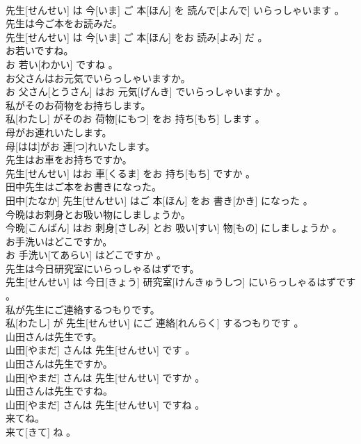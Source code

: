 \documentclass[8pt]{extreport}
\begin{document}
\begin{CJK}{UTF8}{min}
\\	先生[せんせい] は 今[いま] ご 本[ほん] を 読んで[よんで] いらっしゃいます 。
\\	先生は今ご本をお読みだ。	
\\	先生[せんせい] は 今[いま] ご 本[ほん] をお 読み[よみ] だ 。
\\	お若いですね。	
\\	お 若い[わかい] ですね 。
\\	お父さんはお元気でいらっしゃいますか。	
\\	お 父さん[とうさん] はお 元気[げんき] でいらっしゃいますか 。
\\	私がそのお荷物をお持ちします。	
\\	私[わたし] がそのお 荷物[にもつ] をお 持ち[もち] します 。
\\	母がお連れいたします。	
\\	母[はは]がお 連[つ]れいたします。
\\	先生はお車をお持ちですか。	
\\	先生[せんせい] はお 車[くるま] をお 持ち[もち] ですか 。
\\	田中先生はご本をお書きになった。	
\\	田中[たなか] 先生[せんせい] はご 本[ほん] をお 書き[かき] になった 。
\\	今晩はお刺身とお吸い物にしましょうか。	
\\	今晩[こんばん] はお 刺身[さしみ] とお 吸い[すい] 物[もの] にしましょうか 。
\\	お手洗いはどこですか。	
\\	お 手洗い[てあらい] はどこですか 。
\\	先生は今日研究室にいらっしゃるはずです。	
\\	先生[せんせい] は 今日[きょう] 研究室[けんきゅうしつ] にいらっしゃるはずです 。
\\	私が先生にご連絡するつもりです。	
\\	私[わたし] が 先生[せんせい] にご 連絡[れんらく] するつもりです 。
\\	山田さんは先生です。	
\\	山田[やまだ] さんは 先生[せんせい] です 。
\\	山田さんは先生ですか。	
\\	山田[やまだ] さんは 先生[せんせい] ですか 。
\\	山田さんは先生ですね。	
\\	山田[やまだ] さんは 先生[せんせい] ですね 。
\\	来てね。	
\\	来て[きて] ね 。

\end{CJK}
\end{document}
